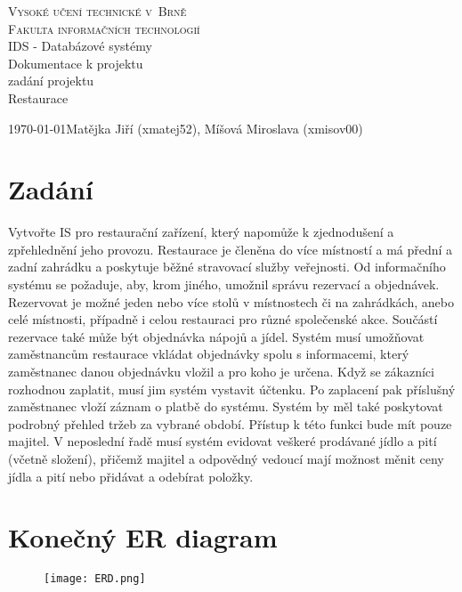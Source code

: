 \documentclass[11pt, a4paper]{article}[]
\begin{document}
	\thispagestyle{empty}

	\begin{center}
		\Huge
			\textsc{Vysoké učení technické v~Brně\\}
		\huge
			\textsc{Fakulta informačních technologií\\}
		\LARGE
			IDS - Databázové systémy \\
		\Huge
			Dokumentace k projektu \\

		\LARGE	zadání projektu\\
			Restaurace \\
	\end{center}
		{\Large \today \hfill Matějka Jiří (xmatej52), Míšová Miroslava (xmisov00)} %
	\pagebreak
	\setcounter{page}{1}

	\section{Zadání}
	Vytvořte IS pro restaurační zařízení, který napomůže k zjednodušení a zpřehlednění jeho provozu. Restaurace je členěna do více místností a má přední a zadní zahrádku a poskytuje běžné stravovací služby veřejnosti. Od informačního systému se požaduje, aby, krom jiného, umožnil správu rezervací a objednávek. Rezervovat je možné jeden nebo více stolů v místnostech či na zahrádkách, anebo celé místnosti, případně i celou restauraci pro různé společenské akce. Součástí rezervace také může být objednávka nápojů a jídel. Systém musí umožňovat zaměstnancům restaurace vkládat objednávky spolu s informacemi, který zaměstnanec danou objednávku vložil a pro koho je určena. Když se zákazníci rozhodnou zaplatit, musí jim systém vystavit účtenku. Po zaplacení pak příslušný zaměstnanec vloží záznam o platbě do systému. Systém by měl také poskytovat podrobný přehled tržeb za vybrané období. Přístup k této funkci bude mít pouze majitel. V neposlední řadě musí systém evidovat veškeré prodávané jídlo a pití (včetně složení), přičemž majitel a odpovědný vedoucí mají možnost měnit ceny jídla a pití nebo přidávat a odebírat položky.

	\section{Konečný ER diagram}
	\begin{figure}[h]
	\begin{center}
		\texttt{[image: ERD.png]}
		\label{fig:obr_ERD}
	\end{center}
	\end{figure}
    \pagebreak
\end{document}

